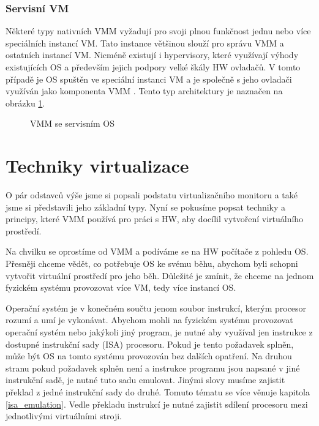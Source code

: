 \subsubsection*{Servisní VM}

Některé typy nativních VMM vyžadují pro svoji plnou funkčnost jednu nebo více speciálních instancí VM. Tato instance většinou slouží pro správu VMM a ostatních instancí VM. Nicméně existují i hypervisory, které využívají výhody
existujících OS a především jejich podpory velké škály HW ovladačů. V tomto případě je OS spuštěn ve speciální instanci VM a je společně s jeho ovladači využíván jako komponenta VMM \cite{vmm1}. Tento typ architektury je 
naznačen na obrázku \ref{servise_vmm}.

\begin{figure}
    \centering    
    \caption{VMM se servisním OS}
    \label{servise_vmm}
\end{figure}

\section{Techniky virtualizace}
\label{virt_techniques}

O pár odstavců výše jsme si popsali podstatu virtualizačního monitoru a také jsme si představili jeho základní typy. Nyní se pokusíme popsat techniky a principy, které VMM používá pro práci s HW, aby docílil vytvoření virtuálního prostředí.  

Na chvilku se oprostíme od VMM a podíváme se na HW počítače z pohledu OS. Přesněji chceme vědět, co potřebuje OS ke svému běhu, abychom byli schopni vytvořit virtuální prostředí pro jeho běh. Důležité je zmínit, že chceme na jednom
fyzickém systému provozovat více VM, tedy více instancí OS.

Operační systém je v konečném součtu jenom soubor instrukcí, kterým procesor rozumí a umí je vykonávat. Abychom mohli na fyzickém systému provozovat operační systém nebo jakýkoli jiný program, je nutné aby využíval jen instrukce z
dostupné instrukční sady (ISA) procesoru. Pokud je tento požadavek splněn, může být OS na tomto systému provozován bez dalších opatření. Na druhou stranu pokud požadavek splněn není a instrukce programu jsou napsané v jiné instrukční sadě, 
je nutné tuto sadu emulovat. Jinými slovy musíme zajistit překlad z jedné instrukční sady do druhé. Tomuto tématu se více věnuje kapitola \ref{isa_emulation}. Vedle překladu instrukcí je nutné zajistit sdílení procesoru mezi jednotlivými
virtuálními stroji.

